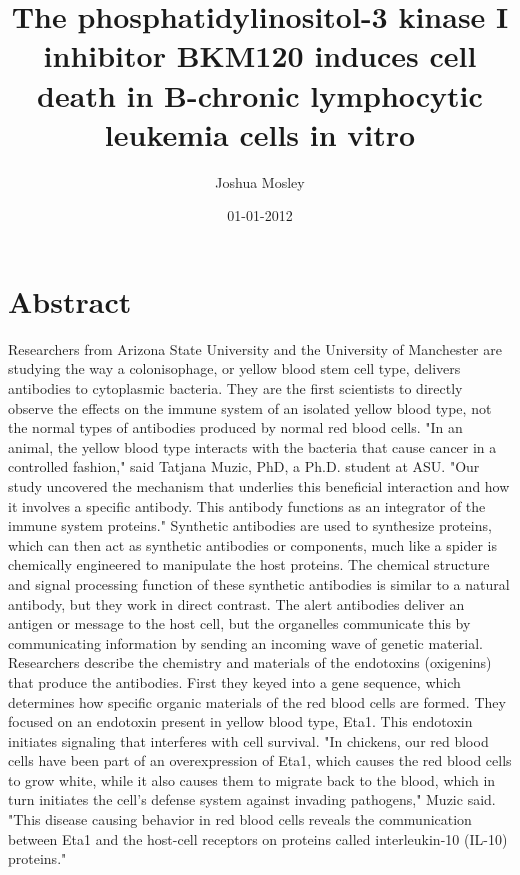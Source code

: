 \documentclass{article}%
\title{The phosphatidylinositol{-}3 kinase I inhibitor BKM120 induces cell death in B{-}chronic lymphocytic leukemia cells in vitro}%
\author{Joshua Mosley}%
\affil{Institute of Bioinformatics and Biosignal Transduction, College of Bioscience and Biotechnology, National Cheng{-}Kung University, Tainan, Taiwan}%
\date{01{-}01{-}2012}%
\begin{document}
%
\normalsize%
\maketitle%
\section{Abstract}%
\label{sec:Abstract}%
Researchers from Arizona State University and the University of Manchester are studying the way a colonisophage, or yellow blood stem cell type, delivers antibodies to cytoplasmic bacteria. They are the first scientists to directly observe the effects on the immune system of an isolated yellow blood type, not the normal types of antibodies produced by normal red blood cells.\newline%
"In an animal, the yellow blood type interacts with the bacteria that cause cancer in a controlled fashion," said Tatjana Muzic, PhD, a Ph.D. student at ASU. "Our study uncovered the mechanism that underlies this beneficial interaction and how it involves a specific antibody. This antibody functions as an integrator of the immune system proteins."\newline%
Synthetic antibodies are used to synthesize proteins, which can then act as synthetic antibodies or components, much like a spider is chemically engineered to manipulate the host proteins. The chemical structure and signal processing function of these synthetic antibodies is similar to a natural antibody, but they work in direct contrast. The alert antibodies deliver an antigen or message to the host cell, but the organelles communicate this by communicating information by sending an incoming wave of genetic material.\newline%
Researchers describe the chemistry and materials of the endotoxins (oxigenins) that produce the antibodies. First they keyed into a gene sequence, which determines how specific organic materials of the red blood cells are formed. They focused on an endotoxin present in yellow blood type, Eta1. This endotoxin initiates signaling that interferes with cell survival.\newline%
"In chickens, our red blood cells have been part of an overexpression of Eta1, which causes the red blood cells to grow white, while it also causes them to migrate back to the blood, which in turn initiates the cell's defense system against invading pathogens," Muzic said. "This disease causing behavior in red blood cells reveals the communication between Eta1 and the host{-}cell receptors on proteins called interleukin{-}10 (IL{-}10) proteins."\newline%
\end{document}
